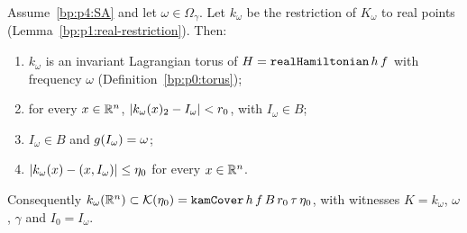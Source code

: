 \begin{theorem}\label{bp:p4:real-torus}
Assume~\eqref{bp:p4:SA} and let $\omega\in\Omega_\gamma$. Let $k_\omega$ be the restriction of
$K_\omega$ to real points (Lemma~\ref{bp:p1:real-restriction}). Then:
\begin{enumerate}[label=(\roman*)]
\item $k_\omega$ is an invariant Lagrangian torus of $H=\texttt{realHamiltonian}\,h\,f$ with
  frequency $\omega$ (Definition~\ref{bp:p0:torus});
\item for every $x\in\mathbb{R}^n$, $\lvert k_\omega(x)_2-I_\omega\rvert<r_0$, with $I_\omega\in B$;
\item $I_\omega\in B$ and $g(I_\omega)=\omega$;
\item $\lvert k_\omega(x)-(x,I_\omega)\rvert\le\eta_0$ for every $x\in\mathbb{R}^n$.
\end{enumerate}
Consequently $k_\omega(\mathbb{R}^n)\subset\mathcal K(\eta_0)=\texttt{kamCover}\,h\,f\,B\,r_0\,\tau\,\eta_0$,
with witnesses $K=k_\omega$, $\omega$, $\gamma$ and $I_0=I_\omega$.
\end{theorem}

